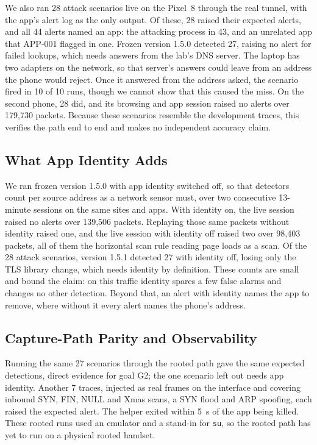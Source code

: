 \documentclass[runningheads]{llncs}
\begin{document}
We also ran 28 attack scenarios live on the Pixel~8 through the real tunnel, with the app's alert log as the only output. Of these, 28 raised their expected alerts, and all 44 alerts named an app: the attacking process in 43, and an unrelated app that APP-001 flagged in one. Frozen version 1.5.0 detected 27, raising no alert for failed lookups, which needs answers from the lab's DNS server. The laptop has two adapters on the network, so that server's answers could leave from an address the phone would reject. Once it answered from the address asked, the scenario fired in 10 of 10 runs, though we cannot show that this caused the miss. On the second phone, 28 did, and its browsing and app session raised no alerts over 179{,}730 packets. Because these scenarios resemble the development traces, this verifies the path end to end and makes no independent accuracy claim.

\subsection{What App Identity Adds}\label{sec:identity}

We ran frozen version 1.5.0 with app identity switched off, so that detectors count per source address as a network sensor must, over two consecutive 13-minute sessions on the same sites and apps. With identity on, the live session raised no alerts over 139{,}506 packets. Replaying those same packets without identity raised one, and the live session with identity off raised two over 98{,}403 packets, all of them the horizontal scan rule reading page loads as a scan. Of the 28 attack scenarios, version 1.5.1 detected 27 with identity off, losing only the TLS library change, which needs identity by definition. These counts are small and bound the claim: on this traffic identity spares a few false alarms and changes no other detection. Beyond that, an alert with identity names the app to remove, where without it every alert names the phone's address.

\subsection{Capture-Path Parity and Observability}\label{sec:parity}

Running the same 27 scenarios through the rooted path gave the same expected detections, direct evidence for goal G2; the one scenario left out needs app identity. Another 7 traces, injected as real frames on the interface and covering inbound SYN, FIN, NULL and Xmas scans, a SYN flood and ARP spoofing, each raised the expected alert. The helper exited within 5~s of the app being killed. These rooted runs used an emulator and a stand-in for \texttt{su}, so the rooted path has yet to run on a physical rooted handset.
\end{document}
